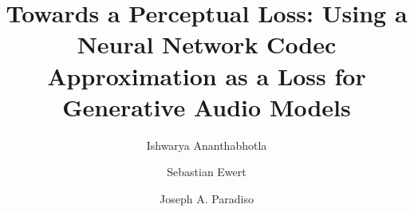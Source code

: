 \documentclass[sigconf]{acmart}
\begin{document}
%
\title[Towards a Perceptual Loss]{Towards a Perceptual Loss:  Using a Neural Network Codec Approximation as a Loss for Generative Audio Models}

%

\author{Ishwarya Ananthabhotla}

\author{Sebastian Ewert}

\author{Joseph A. Paradiso}



%
\end{document}
